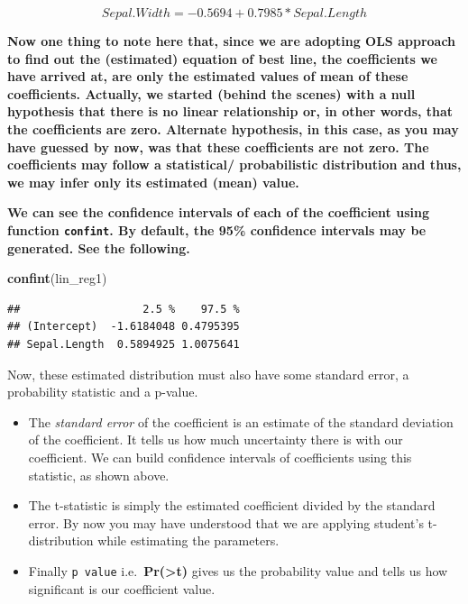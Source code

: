 \documentclass[
]{book}
\newenvironment{Shaded}{\begin{snugshade}}{\end{snugshade}}
\newcommand{\FunctionTok}[1]{\textcolor[rgb]{0.13,0.29,0.53}{\textbf{#1}}}
\newcommand{\NormalTok}[1]{#1}
\providecommand{\tightlist}{%
  \setlength{\itemsep}{0pt}\setlength{\parskip}{0pt}}
\begin{document}
\begin{equation} 
Sepal.Width = -0.5694 + 0.7985 * Sepal.Length
\label{eq:lr4}
\end{equation}

\textbf{Now one thing to note here that, since we are adopting OLS approach to find out the (estimated) equation of best line, the coefficients we have arrived at, are only the estimated values of mean of these coefficients. Actually, we started (behind the scenes) with a null hypothesis that there is no linear relationship or, in other words, that the coefficients are zero. Alternate hypothesis, in this case, as you may have guessed by now, was that these coefficients are not zero. The coefficients may follow a statistical/ probabilistic distribution and thus, we may infer only its estimated (mean) value.}

\textbf{We can see the confidence intervals of each of the coefficient using function \texttt{confint}. By default, the 95\% confidence intervals may be generated. See the following.}

\begin{Shaded}
\begin{Highlighting}[]
\FunctionTok{confint}\NormalTok{(lin\_reg1)}
\end{Highlighting}
\end{Shaded}

\begin{verbatim}
##                   2.5 %    97.5 %
## (Intercept)  -1.6184048 0.4795395
## Sepal.Length  0.5894925 1.0075641
\end{verbatim}

Now, these estimated distribution must also have some standard error, a probability statistic and a p-value.

\begin{itemize}
\tightlist
\item
  The \emph{standard error} of the coefficient is an estimate of the standard deviation of the coefficient. It tells us how much uncertainty there is with our coefficient. We can build confidence intervals of coefficients using this statistic, as shown above.
\item
  The t-statistic is simply the estimated coefficient divided by the standard error. By now you may have understood that we are applying student's t-distribution while estimating the parameters.
\item
  Finally \texttt{p\ value} i.e.~\textbf{Pr(\textgreater\textbar t\textbar)} gives us the probability value and tells us how significant is our coefficient value.
\end{itemize}
\end{document}
